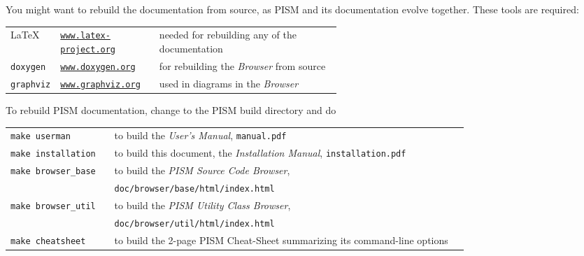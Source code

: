 \documentclass[11pt,final]{amsart}
\renewcommand{\t}[1]{\texttt{#1}}
\begin{document}
You might want to rebuild the documentation from source, as PISM and its documentation evolve together.  These tools are required:
\bigskip
\begin{center}
  \begin{tabular*}{0.9\linewidth}{llp{0.55\linewidth}}
    \toprule
    \LaTeX & \href{http://www.latex-project.org/}{\t{www.latex-project.org}} &  needed for rebuilding any of the documentation \\
    \texttt{doxygen}\index{doxygen} & \href{http://www.stack.nl/~dimitri/doxygen/}{\t{www.doxygen.org}} &  for rebuilding the \emph{Browser} from source  \\
    \texttt{graphviz}\index{graphviz} & \href{http://www.graphviz.org/}{\t{www.graphviz.org}} &  used in diagrams in the \emph{Browser}  \\
    \bottomrule
  \end{tabular*}
\end{center}
\bigskip
\noindent To rebuild PISM documentation, change to the PISM build directory and do
\begin{center}
  \begin{tabular}{p{0.22\linewidth}p{0.75\linewidth}}
    \texttt{make userman} & to build the \emph{User's Manual}, \texttt{manual.pdf}\\
    \texttt{make installation} & to build this document, the \emph{Installation Manual}, \texttt{installation.pdf}\\
    \texttt{make browser_base} & to build the \emph{PISM Source Code Browser},\\
    &\texttt{doc/browser/base/html/index.html}\\
    \texttt{make browser_util} & to build the \emph{PISM Utility Class Browser},\\
    &\texttt{doc/browser/util/html/index.html}\\
    \texttt{make cheatsheet} & to build the 2-page PISM Cheat-Sheet summarizing its command-line options\\
  \end{tabular}
\end{center}
\end{document}
